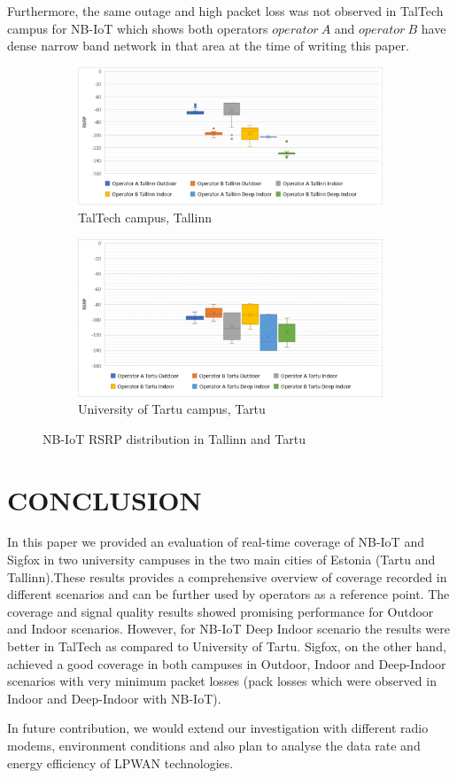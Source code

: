 \documentclass[conference,a4paper,xcolor=table]{IEEEtran}
\begin{document}
Furthermore, the same outage and high packet loss was not observed in TalTech campus for NB-IoT which shows both operators $operator\ A$ and $operator\ B$ have dense narrow band network in that area at the time of writing this paper.


 \begin{figure}[ht!]
\begin{subfigure}[t]{\linewidth}
  \centering
  \includegraphics[width=.7\linewidth]{images/TallinnRSRPboxplot.pdf}  
  \caption{TalTech campus, Tallinn}
\end{subfigure}
\begin{subfigure}[t]{\linewidth}
  \centering
  \includegraphics[width=.7\linewidth]{images/TartuRSRPboxplot.pdf}  
  \caption{University of Tartu campus, Tartu}
  
\end{subfigure}
\caption{NB-IoT RSRP distribution in Tallinn and Tartu}
 \label{boxplot}
\end{figure}

\section{CONCLUSION} \label{conclusion}
In this paper we provided an evaluation of real-time coverage of NB-IoT and Sigfox in two university campuses in the two main cities of Estonia (Tartu and Tallinn).These results provides a comprehensive overview of coverage recorded in different scenarios and can be further used by operators as a reference point. The coverage and signal quality results showed promising performance for Outdoor and Indoor scenarios. However, for NB-IoT Deep Indoor scenario the results were better in TalTech as compared to University of Tartu. Sigfox, on the other hand, achieved a good coverage in both campuses in Outdoor, Indoor and Deep-Indoor scenarios with very minimum packet losses (pack losses which were observed in Indoor and Deep-Indoor with NB-IoT).\par
In future contribution, we would extend our investigation with different radio modems, environment conditions and also plan to analyse the data rate and energy efficiency of LPWAN technologies.
\end{document}
